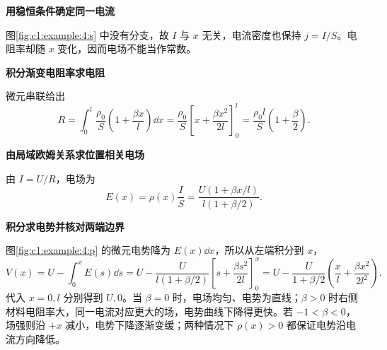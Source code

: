 \begin{solution}\textbf{用稳恒条件确定同一电流}\par\nobreak
图\ref{fig:c1:example:4:s} 中没有分支，故 $I$ 与 $x$ 无关，电流密度也保持 $j=I/S$。电阻率却随 $x$ 变化，因而电场不能当作常数。

\par\medskip{}\noindent\textbf{积分渐变电阻率求电阻}\par\nobreak
微元串联给出
\[
 R=\int_0^l\frac{\rho_0}{S}\left(1+\frac{\beta x}l\right)\dd x
 =\frac{\rho_0}{S}\left[x+\frac{\beta x^2}{2l}\right]_0^l
=\frac{\rho_0l}{S}\left(1+\frac\beta2\right).
\]


\par\medskip{}\noindent\textbf{由局域欧姆关系求位置相关电场}\par\nobreak
由 $I=U/R$，电场为
\[
 E(x)=\rho(x)\frac IS
 =\frac{U(1+\beta x/l)}{l(1+\beta/2)}.
\]



\par\medskip{}\noindent\textbf{积分求电势并核对两端边界}\par\nobreak
图\ref{fig:c1:example:4:p} 的微元电势降为 $E(x)\dd x$，所以从左端积分到 $x$，
\[
 V(x)=U-\int_0^xE(s)\dd s
 =U-\frac{U}{l(1+\beta/2)}
 \left[s+\frac{\beta s^2}{2l}\right]_0^x
=U-\frac{U}{1+\beta/2}\left(\frac xl+\frac{\beta x^2}{2l^2}\right).
\]
代入 $x=0,l$ 分别得到 $U,0$。当 $\beta=0$ 时，电场均匀、电势为直线；$\beta>0$ 时右侧材料电阻率大，同一电流对应更大的场，电势曲线下降得更快。若 $-1<\beta<0$，场强则沿 $+x$ 减小，电势下降逐渐变缓；两种情况下 $\rho(x)>0$ 都保证电势沿电流方向降低。\end{solution}
